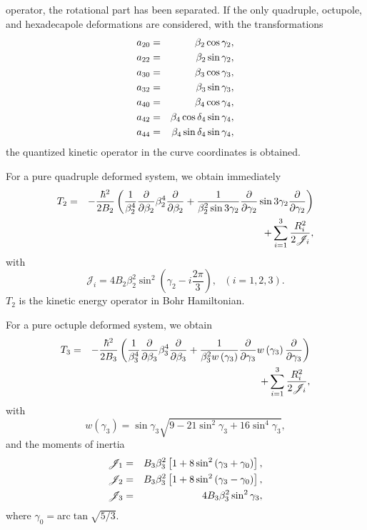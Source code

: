 \documentclass[twocolumn,prc,showpacs,preprintnumbers,superscriptaddress,floatfix]{revtex4}
\begin{document}
operator, the rotational part has been separated. If the only quadruple,
octupole, and hexadecapole deformations are considered, with the
transformations
\begin{eqnarray}
a_{20} &=&\beta _{2}\cos \gamma _{2},  \notag \\
a_{22} &=&\beta _{2}\sin \gamma _{2},  \notag \\
a_{30} &=&\beta _{3}\cos \gamma _{3},  \notag \\
a_{32} &=&\beta _{3}\sin \gamma _{3},  \notag \\
a_{40} &=&\beta _{4}\cos \gamma _{4},  \notag \\
a_{42} &=&\beta _{4}\cos \delta _{4}\sin \gamma _{4},  \notag \\
a_{44} &=&\beta _{4}\sin \delta _{4}\sin \gamma _{4},
\end{eqnarray}%
the quantized kinetic operator in the curve coordinates is obtained.

For a pure quadruple deformed system, we obtain immediately
\begin{eqnarray}
T_{2} &=&-\frac{\hbar ^{2}}{2B_{2}}\left( \frac{1}{\beta _{2}^{4}}\frac{%
\partial }{\partial \beta _{2}}\beta _{2}^{4}\frac{\partial }{\partial \beta
_{2}}+\frac{1}{\beta _{2}^{2}\sin 3\gamma _{2}}\frac{\partial }{\partial
\gamma _{2}}\sin 3\gamma _{2}\frac{\partial }{\partial \gamma _{2}}\right)
\notag \\
&&+\sum_{i=1}^{3}\frac{R_{i}^{2}}{2\mathscr{J}_{i}},  \label{T2}
\end{eqnarray}%
with
\begin{equation}
\mathscr{J}_{i}=4B_{2}\beta _{2}^{2}\sin ^{2}\left( \gamma _{2}-i\frac{2\pi
}{3}\right) ,\text{ \ \ \ }\left( i=1,2,3\right) .
\end{equation}%
$T_{2}$ is the kinetic energy operator in Bohr Hamiltonian.

For a pure octuple deformed system, we obtain
\begin{eqnarray}
T_{3} &=&-\frac{\hbar ^{2}}{2B_{3}}\left( \frac{1}{\beta _{3}^{4}}\frac{%
\partial }{\partial \beta _{3}}\beta _{3}^{4}\frac{\partial }{\partial \beta
_{3}}+\frac{1}{\beta _{3}^{2}w\left( \gamma _{3}\right) }\frac{\partial }{%
\partial \gamma _{3}}w\left( \gamma _{3}\right) \frac{\partial }{\partial
\gamma _{3}}\right)  \notag \\
&&+\sum_{i=1}^{3}\frac{R_{i}^{2}}{2\mathscr{J}_{i}},  \label{T3}
\end{eqnarray}%
with
\begin{equation}
w\left( \gamma _{3}\right) =\sin \gamma _{3}\sqrt{9-21\sin ^{2}\gamma
_{3}+16\sin ^{4}\gamma _{3}},
\end{equation}%
and the moments of inertia
\begin{eqnarray}
\mathscr{J}_{1} &=&B_{3}\beta _{3}^{2}\left[ 1+8\sin ^{2}\left( \gamma
_{3}+\gamma _{0}\right) \right] ,  \notag \\
\mathscr{J}_{2} &=&B_{3}\beta _{3}^{2}\left[ 1+8\sin ^{2}\left( \gamma
_{3}-\gamma _{0}\right) \right] ,  \notag \\
\mathscr{J}_{3} &=&4B_{3}\beta _{3}^{2}\sin ^{2}\gamma _{3},
\end{eqnarray}
where $\gamma _{0}=$arc$\tan \sqrt{5/3}$.
\end{document}
